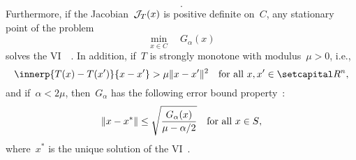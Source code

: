 \documentclass[../../main]{subfiles}
\begin{document}
\begin{example}
\begin{description}
\begin{equation}
            .\end{equation} 
            Furthermore, if the Jacobian~$\mathcal{J}_{T}(x)$ is positive definite on~$C$, any stationary point of the problem
            \begin{equation}
                \min_{x \in C} \quad G_\alpha(x)
            \end{equation} 
            solves the VI~~\cite{Fukushima1992}.
            In addition, if~$T$ is strongly monotone with modulus~$\mu > 0$, i.e.,
            \begin{equation}
                \innerp{T(x) - T(x')}{x - x'} > \mu \norm{x - x'}^2 \forallcondition{x, x' \in \setR^n}
            ,\end{equation}
            and if~$\alpha < 2 \mu$, then~$G_\alpha$ has the following error bound property~\cite{Taji1993}:
            \begin{equation}
                \lVert x - x^\ast\rVert \le \sqrt{\frac{G_\alpha(x)}{\mu - \alpha / 2}} \quad \text{for all~$x \in S$}
            ,\end{equation} 
            where~$x^\ast$ is the unique solution of the VI~.
    \end{description}
\end{example}
\end{document}
